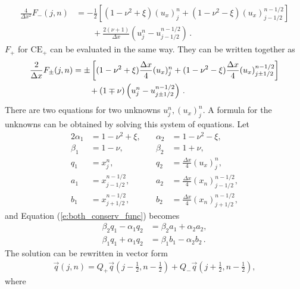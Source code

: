 \documentclass[letterpaper,12pt,dvips]{article}
\numberwithin{equation}{section}
\begin{document}
\begin{align*}
  \frac{4}{\Delta x^2}F_-(j,n) &= 
    -\frac{1}{2}\left[
      (1-\nu^2+\xi)(u_x)_j^n + (1-\nu^2-\xi)(u_x)_{j-1/2}^{n-1/2}
    \right] \\
  &\quad\quad 
  + \frac{2(\nu+1)}{\Delta x}\left(u_j^n-u_{j-1/2}^{n-1/2}\right) \,. 
\end{align*}
$F_+$ for $\mathrm{CE}_+$ can be evaluated in the same way.
They can be written together as
\begin{align}
  \frac{2}{\Delta x}F_{\pm}(j,n) &= 
    \pm\left[
        (1-\nu^2+\xi)\frac{\Delta x}{4}(u_x)_j^n
      + (1-\nu^2-\xi)\frac{\Delta x}{4}(u_x)_{j\pm1/2}^{n-1/2}
    \right] \notag \\
  &\quad\quad
  + (1\mp\nu)\left(u_j^n-u_{j\pm1/2}^{n-1/2}\right)\,. 
    \label{e:both_conserv_func}
\end{align}
There are two equations for two unknowns $u_j^n, (u_x)_j^n$.
A formula for the unknowns can be obtained by solving this system of 
equations.
Let
\begin{alignat*}{2}
  \alpha_1 &= 1-\nu^2+\xi,\quad &\alpha_2 &= 1-\nu^2-\xi, \\
  \beta_1 &= 1-\nu, &\beta_2 &= 1+\nu, \\
  q_1 &= x_j^n, &q_2 &= \frac{\Delta x}{4}(u_x)_j^n, \\
  a_1 &= x_{j-1/2}^{n-1/2}, 
 &a_2 &= \frac{\Delta x}{4}(x_n)_{j-1/2}^{n-1/2}, \\
  b_1 &= x_{j+1/2}^{n-1/2}, 
 &b_2 &= \frac{\Delta x}{4}(x_n)_{j+1/2}^{n-1/2}, 
\end{alignat*}
and Equation (\ref{e:both_conserv_func}) becomes
\begin{align*}
  \beta_2q_1 - \alpha_1q_2 &= \beta_2a_1 + \alpha_2a_2, \\
  \beta_1q_1 + \alpha_1q_2 &= \beta_1b_1 - \alpha_2b_2\,.
\end{align*}
The solution can be rewritten in vector form
\begin{align*}
  \vec{q}(j,n) = 
    Q_+\vec{q}(j-\frac{1}{2},n-\frac{1}{2})
  + Q_-\vec{q}(j+\frac{1}{2},n-\frac{1}{2}), 
\end{align*}
where
\end{document}
